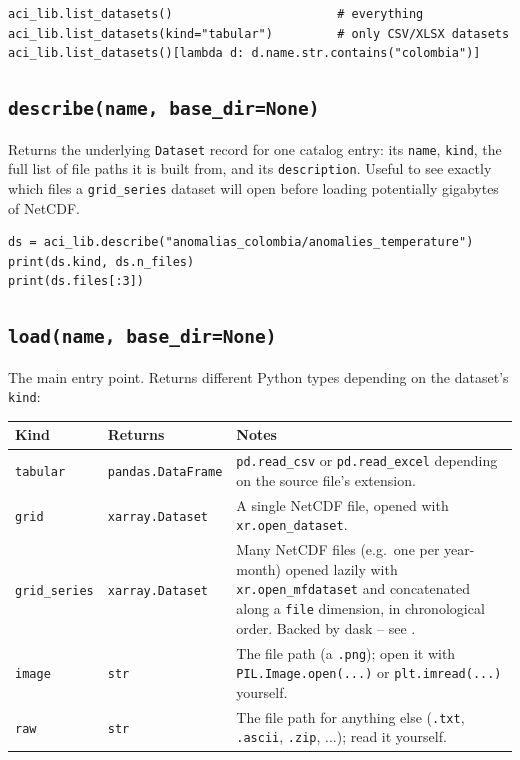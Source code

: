 \documentclass[11pt]{article}
\begin{document}
\begin{lstlisting}
aci_lib.list_datasets()                       # everything
aci_lib.list_datasets(kind="tabular")         # only CSV/XLSX datasets
aci_lib.list_datasets()[lambda d: d.name.str.contains("colombia")]
\end{lstlisting}

\subsection{\texttt{describe(name, base\_dir=None)}}

Returns the underlying \texttt{Dataset} record for one catalog entry: its
\texttt{name}, \texttt{kind}, the full list of file paths it is built
from, and its \texttt{description}. Useful to see exactly which files a
\texttt{grid\_series} dataset will open before loading potentially
gigabytes of NetCDF.

\begin{lstlisting}
ds = aci_lib.describe("anomalias_colombia/anomalies_temperature")
print(ds.kind, ds.n_files)
print(ds.files[:3])
\end{lstlisting}

\subsection{\texttt{load(name, base\_dir=None)}}

The main entry point. Returns different Python types depending on the
dataset's \texttt{kind}:

\begin{longtable}{@{}L{2.4cm}L{4.6cm}L{7.0cm}@{}}
\toprule
\textbf{Kind} & \textbf{Returns} & \textbf{Notes} \\
\midrule
\endhead
\texttt{tabular} & \texttt{pandas.DataFrame} & \texttt{pd.read\_csv} or \texttt{pd.read\_excel} depending on the source file's extension. \\
\texttt{grid} & \texttt{xarray.Dataset} & A single NetCDF file, opened with \texttt{xr.open\_dataset}. \\
\texttt{grid\_series} & \texttt{xarray.Dataset} & Many NetCDF files (e.g.\ one per year-month) opened lazily with \texttt{xr.open\_mfdataset} and concatenated along a \texttt{file} dimension, in chronological order. Backed by dask -- see . \\
\texttt{image} & \texttt{str} & The file path (a \texttt{.png}); open it with \texttt{PIL.Image.open(...)} or \texttt{plt.imread(...)} yourself. \\
\texttt{raw} & \texttt{str} & The file path for anything else (\texttt{.txt}, \texttt{.ascii}, \texttt{.zip}, ...); read it yourself. \\
\bottomrule
\end{longtable}
\end{document}
